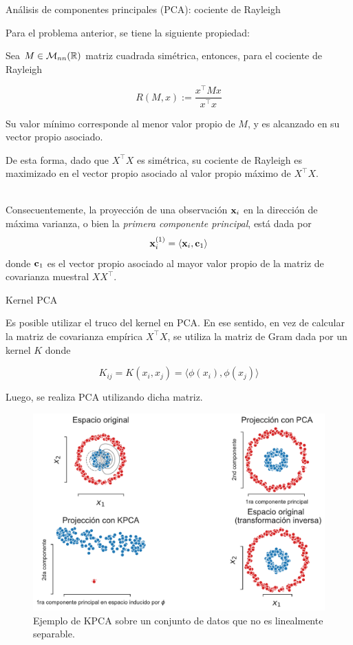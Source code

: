 \documentclass[9pt]{beamer}
\begin{document}
\begin{frame}{Análisis de componentes principales (PCA): cociente de Rayleigh}
	
Para el problema anterior, se tiene la siguiente propiedad:

\begin{lemma}

Sea $M\in\mathcal{M}_{nn}(\mathbb{R})$ matriz cuadrada simétrica, entonces, para el cociente de Rayleigh

\begin{equation*}
	R(M,x):=\frac{x^\top Mx}{x^\top x}
\end{equation*}

Su valor mínimo corresponde al menor valor propio de $M$, y es alcanzado en su vector propio asociado.

\end{lemma}
\pause
De esta forma, dado que $X^\top X$ es simétrica, su cociente de Rayleigh es maximizado en el vector propio asociado al valor propio máximo de $X^\top X$.\\~\ \pause

Consecuentemente, la proyección de una observación $\mathbf{x}_i$ en la dirección de máxima varianza, o bien la \emph{primera componente principal}, está dada por 
\begin{equation*}
	\mathbf{x}_i^{(1)} = \langle \mathbf{x}_i, \mathbf{c}_1 \rangle
\end{equation*}
donde $\mathbf{c}_1$ es el vector propio asociado al mayor valor propio de la matriz de covarianza muestral $XX^\top$.\\	
\end{frame}

\begin{frame}{Kernel PCA}

Es posible utilizar el truco del kernel en PCA. En ese sentido, en vez de calcular la matriz de covarianza empírica $X^\top X$, se utiliza la matriz de Gram dada por un kernel $K$ donde

$$
K_{ij} = K(x_i,x_j) = \langle\phi(x_i),\phi(x_j)\rangle
$$

Luego, se realiza PCA utilizando dicha matriz.\\ \pause

\begin{figure}[ht]
    \centering
    \includegraphics[width=0.6\linewidth]{../img/cap6_kpca.pdf}
    \caption{Ejemplo de KPCA sobre un conjunto de datos que no es linealmente separable.}
    \label{fig:kpca}
\end{figure}

\end{frame}
\end{document}
